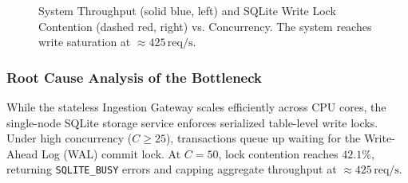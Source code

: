 \begin{figure}[H]
\centering
{}
\caption{System Throughput (solid blue, left) and SQLite Write Lock Contention (dashed red, right) vs. Concurrency. The system reaches write saturation at $\approx 425\,\text{req/s}$.}
\label{fig:bottleneck}
\end{figure}

\subsubsection{Root Cause Analysis of the Bottleneck}
While the stateless Ingestion Gateway scales efficiently across CPU cores, the single-node SQLite storage service enforces serialized table-level write locks. Under high concurrency ($C \ge 25$), transactions queue up waiting for the Write-Ahead Log (WAL) commit lock. At $C = 50$, lock contention reaches $42.1\%$, returning \texttt{SQLITE\_BUSY} errors and capping aggregate throughput at $\approx 425\,\text{req/s}$.
